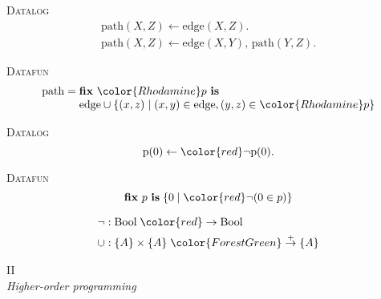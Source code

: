 \documentclass[dvipsnames,fleqn]{beamer}
\providecommand\EMPH\textsc
\newcommand\kw\textbf
\newcommand\name\text
\newcommand\tset[1]{\{{#1}\}}
\newcommand\x\times
\newcommand\eset[1]{\{{#1}\}}
\newcommand\esetfor[2]{\eset{{#1} \mathrel{|} {#2}}}
\newcommand\efix[1]{\kw{fix}~{#1}~\kw{is}\;}
\newcommand\efixh[1]{\efix{\hilit #1}}
\newcommand\hilit{\color{Rhodamine}}
\begin{document}


\begin{frame}{}
  \EMPH{Datalog}
  \[
  \begin{array}{l}
    \name{path}(X,Z) \gets \name{edge}(X,Z).\\
    \name{path}(X,Z) \gets \name{edge}(X,Y),\, \name{path}(Y,Z).
  \end{array}
  \]
  \vspace{0pt}

  \EMPH{Datafun}
  \[
  \begin{array}{l}
    \name{path} =
    \efixh{p}\\
    \phantom{\name{path} ={}}
    \name{edge} \cup \esetfor{(x,z)}{(x,y) \in \name{edge}, (y,z) \in \hilit p}
  \end{array}
  \]
\end{frame}


\newcommand\tbool{\text{Bool}}
\newcommand\dto\to
\newcommand\mto{\overset{+}{\to}}

\begin{frame}
  \EMPH{Datalog}
  \[ \name{p}(0) \gets {\color{red}\neg}\name{p}(0).\]

  \EMPH{Datafun}
  \[
  \efix{p} \esetfor{0}{\mathop{\color{red}\neg}(0 \in p)}
  \]

  \begin{ceqn}
    \begin{align*}
    {\neg} &: \tbool \mathrel{\color{red}\dto} \tbool\\
    {\cup} &: \tset{A} \x \tset{A} \mathrel{\color{ForestGreen}\mto} \tset{A}
    \end{align*}
  \end{ceqn}
\end{frame}




\begin{frame}
  \centering \huge
  {II}\\[1ex] \huge
  \emph{Higher-order programming}
\end{frame}
\end{document}
